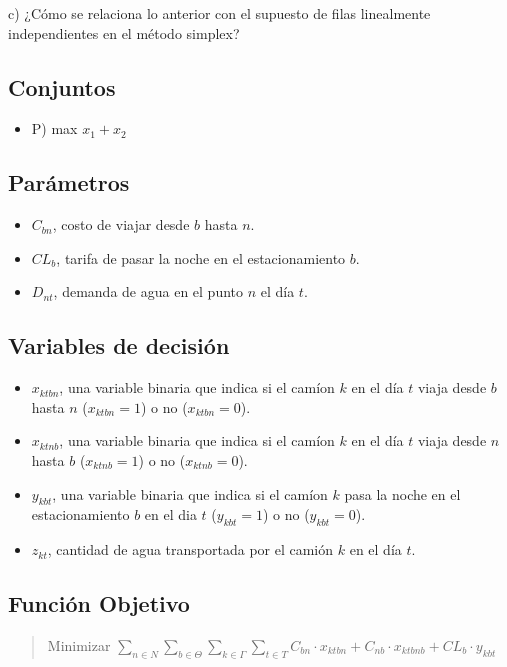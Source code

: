 \documentclass{article}
\begin{document}
\begin{flushleft}
		c) ¿Cómo se relaciona lo anterior con el supuesto de filas linealmente independientes en el método simplex?\\

		\subsection{Conjuntos}
		\begin{itemize}
			\item P) max    $x_1 + x_2$

		\end{itemize}

		\subsection{Parámetros}
		\begin{itemize}
			\item $C_{bn}$, costo de viajar desde $b$ hasta $n$.
			\item $CL_b$, tarifa de pasar la noche en el estacionamiento $b$.
			\item $D_{nt}$, demanda de agua en el punto $n$ el día $t$.
		\end{itemize}

		\subsection{Variables de decisión} 
		\begin{itemize}
			\item $x_{ktbn}$, una variable binaria que indica si el cam\'ion $k$ en el d\'ia $t$ viaja desde $b$ hasta $n$ ($x_{ktbn} = 1$) o no ($x_{ktbn} = 0$).
			\item $x_{ktnb}$, una variable binaria que indica si el cam\'ion $k$ en el d\'ia $t$ viaja desde $n$ hasta $b$ ($x_{ktnb} = 1$) o no ($x_{ktnb} = 0$).
			\item $y_{kbt}$, una variable binaria que indica si el cam\'ion $k$ pasa la noche en el estacionamiento $b$  en el dia $t$ ($y_{kbt} = 1$) o no ($y_{kbt} = 0$).
			\item $z_{kt}$, cantidad de agua transportada por el cami\'on $k$ en el d\'ia $t$.
		\end{itemize}

		\subsection{Función Objetivo}
		\begin{quote}
			\begin{center}
				Minimizar $\sum\limits_{n \in N}\sum\limits_{b \in \Theta}\sum\limits_{k \in \Gamma}\sum\limits_{t \in T} C_{bn} \cdot x_{ktbn} + C_{nb} \cdot x_{ktbnb} + CL_b \cdot y_{kbt}$
			\end{center}
		\end{quote}


\end{flushleft}
\end{document}
